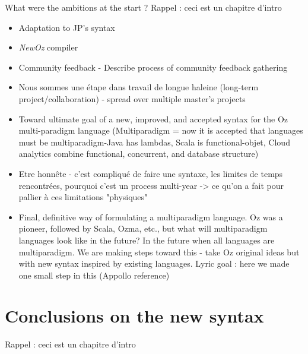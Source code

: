 What were the ambitions at the start ?
Rappel : ceci est un chapitre d'intro
\begin{itemize}
    \item Adaptation to JP's syntax
    \item \textit{NewOz} compiler
    \item Community feedback - Describe process of community feedback gathering
    \item Nous sommes une étape dans travail de longue haleine (long-term project/collaboration) - spread over multiple master's projects
    \item Toward ultimate goal of a new, improved, and accepted syntax for the Oz multi-paradigm language (Multiparadigm = now it is accepted that languages must be multiparadigm-Java has lambdas, Scala is functional-objet, Cloud analytics combine functional, concurrent, and database structure)
    \item Etre honnête - c'est compliqué de faire une syntaxe, les limites de temps rencontrées, pourquoi c'est un process multi-year -> ce qu'on a fait pour pallier à ces limitations "physiques"
    \item Final, definitive way of formulating a multiparadigm language.  Oz was a pioneer, followed by Scala, Ozma, etc., but what will multiparadigm languages look like in the future?  In the future when all languages are multiparadigm. We are making steps toward this - take Oz original ideas but with new syntax inspired by existing languages. Lyric goal : here we made one small step in this (Appollo reference)
\end{itemize}

\section{Conclusions on the new syntax}\label{sec:ch1-4}
Rappel : ceci est un chapitre d'intro
